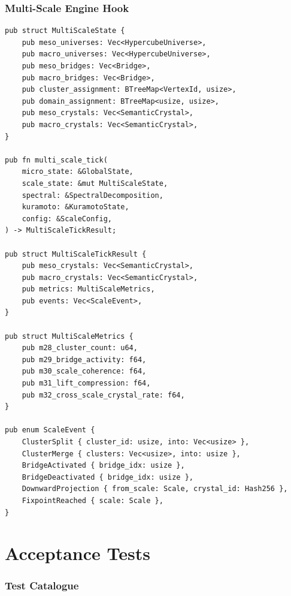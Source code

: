 \documentclass[11pt,a4paper,twoside]{article}
\theoremstyle{definition}
\theoremstyle{plain}
\theoremstyle{remark}
\begin{document}
\section{Multi-Scale Engine Hook}\label{sec:api:engine}

\begin{verbatim}
pub struct MultiScaleState {
    pub meso_universes: Vec<HypercubeUniverse>,
    pub macro_universes: Vec<HypercubeUniverse>,
    pub meso_bridges: Vec<Bridge>,
    pub macro_bridges: Vec<Bridge>,
    pub cluster_assignment: BTreeMap<VertexId, usize>,
    pub domain_assignment: BTreeMap<usize, usize>,
    pub meso_crystals: Vec<SemanticCrystal>,
    pub macro_crystals: Vec<SemanticCrystal>,
}

pub fn multi_scale_tick(
    micro_state: &GlobalState,
    scale_state: &mut MultiScaleState,
    spectral: &SpectralDecomposition,
    kuramoto: &KuramotoState,
    config: &ScaleConfig,
) -> MultiScaleTickResult;

pub struct MultiScaleTickResult {
    pub meso_crystals: Vec<SemanticCrystal>,
    pub macro_crystals: Vec<SemanticCrystal>,
    pub metrics: MultiScaleMetrics,
    pub events: Vec<ScaleEvent>,
}

pub struct MultiScaleMetrics {
    pub m28_cluster_count: u64,
    pub m29_bridge_activity: f64,
    pub m30_scale_coherence: f64,
    pub m31_lift_compression: f64,
    pub m32_cross_scale_crystal_rate: f64,
}

pub enum ScaleEvent {
    ClusterSplit { cluster_id: usize, into: Vec<usize> },
    ClusterMerge { clusters: Vec<usize>, into: usize },
    BridgeActivated { bridge_idx: usize },
    BridgeDeactivated { bridge_idx: usize },
    DownwardProjection { from_scale: Scale, crystal_id: Hash256 },
    FixpointReached { scale: Scale },
}
\end{verbatim}


\part{Acceptance Tests}\label{part:tests}

\section{Test Catalogue}\label{sec:tests}
\end{document}

